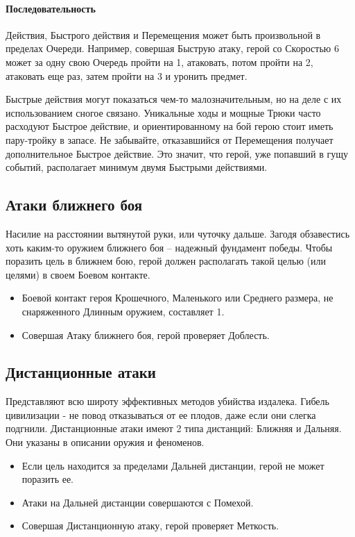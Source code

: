 \paragraph{Последовательность} Действия, Быстрого действия и Перемещения может быть произвольной в пределах Очереди. Например, совершая Быструю атаку, герой со Скоростью 6 может за одну свою Очередь пройти на 1, атаковать, потом пройти на 2, атаковать еще раз, затем пройти на 3 и уронить предмет.
\begin{tcolorbox}
  Быстрые действия могут показаться чем-то малозначительным, но на деле с их использованием сногое связано. Уникальные ходы и мощные Трюки часто расходуют Быстрое действие, и ориентированному на бой герою стоит иметь пару-тройку в запасе. Не забывайте, отказавшийся от Перемещения получает дополнительное Быстрое действие. Это значит, что герой, уже попавший в гущу событий, располагает минимум двумя Быстрыми действиями.
\end{tcolorbox}

\subsection{Атаки ближнего боя}
Насилие на расстоянии вытянутой руки, или чуточку дальше. Загодя обзавестись хоть каким-то оружием ближнего боя – надежный фундамент победы. 
\newline Чтобы поразить цель в ближнем бою, герой должен располагать такой целью (или целями) в своем Боевом контакте.
\begin{itemize}
  \item Боевой контакт героя Крошечного, Маленького или Среднего размера, не снаряженного Длинным оружием, составляет 1.
  \item Совершая Атаку ближнего боя, герой проверяет Доблесть.
\end{itemize}

\subsection{Дистанционные атаки}
Представляют всю широту эффективных методов убийства издалека. Гибель цивилизации -  не повод отказываться от ее плодов, даже если они слегка подгнили.
\newline Дистанционные атаки имеют 2 типа дистанций: Ближняя и Дальняя. Они указаны в описании оружия и феноменов.
\begin{itemize}
  \item Если цель находится за пределами Дальней дистанции, герой не может поразить ее.
  \item Атаки на Дальней дистанции совершаются с Помехой.
  \item Совершая Дистанционную атаку, герой проверяет Меткость.
\end{itemize}
